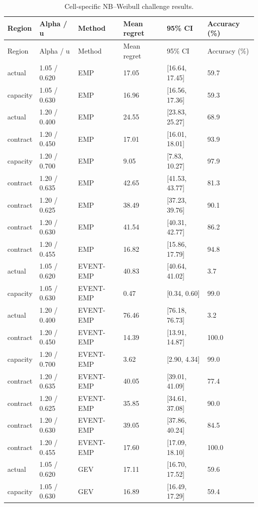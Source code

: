 \begingroup
\fontsize{8.5}{10.5}\selectfont\setlength{\tabcolsep}{3pt}
\begin{longtable}{@{}llllll@{}}
\caption{Cell-specific NB--Weibull challenge results.}\label{tab:final-si-4}\\
\toprule
Region & Alpha / u & Method & Mean regret & 95\% CI & Accuracy (\%)\\\midrule\endfirsthead
Region & Alpha / u & Method & Mean regret & 95\% CI & Accuracy (\%)\\\midrule\endhead
actual & 1.05 / 0.620 & EMP & 17.05 & [16.64, 17.45] & 59.7\\
capacity & 1.05 / 0.630 & EMP & 16.96 & [16.56, 17.36] & 59.3\\
actual & 1.20 / 0.400 & EMP & 24.55 & [23.83, 25.27] & 68.9\\
contract & 1.20 / 0.450 & EMP & 17.01 & [16.01, 18.01] & 93.9\\
capacity & 1.20 / 0.700 & EMP & 9.05 & [7.83, 10.27] & 97.9\\
contract & 1.20 / 0.635 & EMP & 42.65 & [41.53, 43.77] & 81.3\\
contract & 1.20 / 0.625 & EMP & 38.49 & [37.23, 39.76] & 90.1\\
contract & 1.20 / 0.630 & EMP & 41.54 & [40.31, 42.77] & 86.2\\
contract & 1.20 / 0.455 & EMP & 16.82 & [15.86, 17.79] & 94.8\\
actual & 1.05 / 0.620 & EVENT-EMP & 40.83 & [40.64, 41.02] & 3.7\\
capacity & 1.05 / 0.630 & EVENT-EMP & 0.47 & [0.34, 0.60] & 99.0\\
actual & 1.20 / 0.400 & EVENT-EMP & 76.46 & [76.18, 76.73] & 3.2\\
contract & 1.20 / 0.450 & EVENT-EMP & 14.39 & [13.91, 14.87] & 100.0\\
capacity & 1.20 / 0.700 & EVENT-EMP & 3.62 & [2.90, 4.34] & 99.0\\
contract & 1.20 / 0.635 & EVENT-EMP & 40.05 & [39.01, 41.09] & 77.4\\
contract & 1.20 / 0.625 & EVENT-EMP & 35.85 & [34.61, 37.08] & 90.0\\
contract & 1.20 / 0.630 & EVENT-EMP & 39.05 & [37.86, 40.24] & 84.5\\
contract & 1.20 / 0.455 & EVENT-EMP & 17.60 & [17.09, 18.10] & 100.0\\
actual & 1.05 / 0.620 & GEV & 17.11 & [16.70, 17.52] & 59.6\\
capacity & 1.05 / 0.630 & GEV & 16.89 & [16.49, 17.29] & 59.4\\

\end{longtable}
